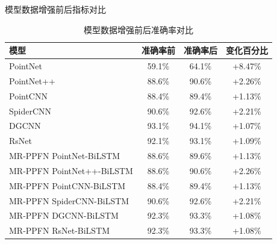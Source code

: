 \begin{table}[htbp]
    \caption{模型数据增强前后指标对比}
    \label{tab:metric-comparison}
    \centering

    \begin{subtable}{\linewidth}
        \centering
        \caption{模型数据增强前后准确率对比}
        \begin{tabular}{lccc}
            \toprule
            \textbf{模型} & \textbf{准确率前} & \textbf{准确率后} & \textbf{变化百分比} \\
            \midrule
            PointNet & 59.1\% & 64.1\% & +8.47\% \\
            PointNet++ & 88.6\% & 90.6\% & +2.26\% \\
            PointCNN & 88.4\% & 89.4\% & +1.13\% \\
            SpiderCNN & 90.6\% & 92.6\% & +2.21\% \\
            DGCNN & 93.1\% & 94.1\% & +1.07\% \\
            RsNet & 92.1\% & 93.1\% & +1.09\% \\
            MR-PPFN PointNet-BiLSTM & 88.6\% & 89.6\% & +1.13\% \\
            MR-PPFN PointNet++-BiLSTM & 88.6\% & 90.6\% & +2.26\% \\
            MR-PPFN PointCNN-BiLSTM & 88.4\% & 89.4\% & +1.13\% \\
            MR-PPFN SpiderCNN-BiLSTM & 90.6\% & 92.6\% & +2.21\% \\
            MR-PPFN DGCNN-BiLSTM & 92.3\% & 93.3\% & +1.08\% \\
            MR-PPFN RsNet-BiLSTM & 92.3\% & 93.3\% & +1.08\% \\
            \bottomrule
        \end{tabular}
        \label{tab:accuracy-comparison}
    \end{subtable}

    \vspace{0.4cm}


\end{table}
